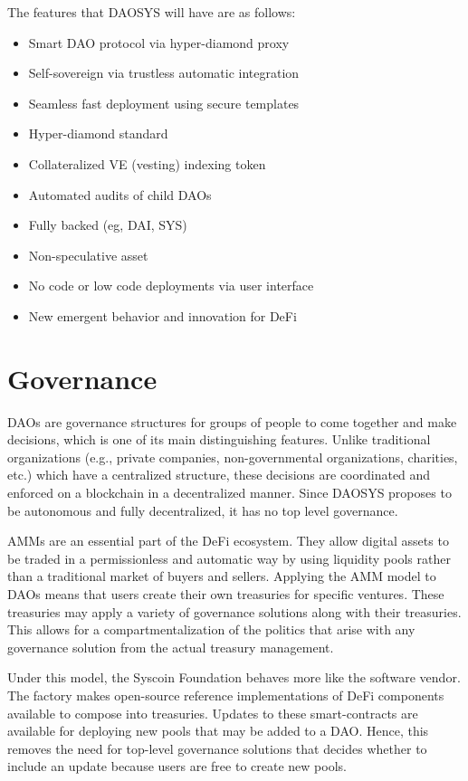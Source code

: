 \documentclass[journal,twocolumn,12pt]{ieeesyscoin}
\begin{document}
The features that DAOSYS will have are as follows:

\begin{itemize}
  \item Smart DAO protocol via hyper-diamond proxy
  \item Self-sovereign via trustless automatic integration
  \item Seamless fast deployment using secure templates
  \item Hyper-diamond standard
  \item Collateralized VE (vesting) indexing token
  \item Automated audits of child DAOs
  \item Fully backed (eg, DAI, SYS)
  \item Non-speculative asset
  \item No code or low code deployments via user interface
  \item New emergent behavior and innovation for DeFi
\end{itemize}  

\section{Governance}
\label{sec:governance}

DAOs are governance structures for groups of people to come together and make decisions, which is one of its main distinguishing features. Unlike traditional organizations (e.g., private companies, non-governmental organizations, charities, etc.) which have a centralized structure, these decisions are coordinated and enforced on a blockchain in a decentralized manner. Since DAOSYS proposes to be autonomous and fully decentralized, it has no top level governance.

AMMs are an essential part of the DeFi ecosystem. They allow digital assets to be traded in a permissionless and automatic way by using liquidity pools rather than a traditional market of buyers and sellers. Applying the AMM model to DAOs means that users create their own treasuries for specific ventures. These treasuries may apply a variety of governance solutions along with their treasuries. This allows for a compartmentalization of the politics that arise with any governance solution from the actual treasury management.

Under this model, the Syscoin Foundation behaves more like the software vendor. The factory makes open-source reference implementations of DeFi components available to compose into treasuries. Updates to these smart-contracts are available for deploying new pools that may be added to a DAO. Hence, this removes the need for top-level governance solutions that decides whether to include an update because users are free to create new pools.
\end{document}
